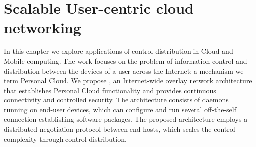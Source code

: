 \chapter{Scalable User-centric cloud networking}
\ifpdf
    \graphicspath{{Chapter3/Chapter3Figs/PNG/}{Chapter3/Chapter3Figs/PDF/}{Chapter3/Chapter3Figs/}}
\else
    \graphicspath{{Chapter3/Chapter3Figs/EPS/}{Chapter3/Chapter3Figs/}}
\fi


In this chapter we explore applications of control distribution in Cloud and
Mobile computing. The work focuses on the problem of information control and
distribution between the devices of a user across the Internet; a mechanism we
term Personal Cloud.  We propose \signpost, an Internet-wide overlay network architecture
that establishes Personal Cloud functionality and provides continuous connectivity
and controlled security. The architecture consists of daemons running on
end-user devices, which can configure and run several off-the-self connection
establishing software packages.  The proposed architecture employs a distributed
negotiation protocol between end-hosts, which scales the control complexity
through control distribution.


